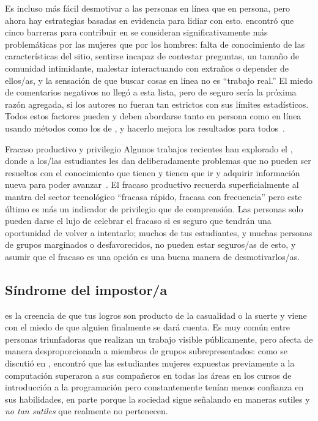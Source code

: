 Es incluso más fácil desmotivar a las personas en línea que en persona,
pero ahora hay estrategias basadas en evidencia para lidiar con esto.
\cite{Ford2016} encontró que cinco barreras para contribuir en 
se consideran significativamente más problemáticas por las mujeres que por los hombres:
falta de conocimiento de las características del sitio,
sentirse incapaz de contestar preguntas,
un tamaño de comunidad intimidante,
malestar interactuando con extraños o depender de ellos/as,
y la sensación de que buscar cosas en línea no es ``trabajo real.''
El miedo de comentarios negativos no llegó a esta lista,
pero de seguro sería la próxima razón agregada, si los autores no fueran tan estrictos con sus límites estadísticos.
Todos estos factores pueden y deben abordarse tanto en persona como en línea
usando métodos como los de ,
y hacerlo mejora los resultados para todos~\cite{Sved2016}.

\begin{aside}{Fracaso productivo y privilegio}
  Algunos trabajos recientes han explorado el ,
 donde a los/las estudiantes les dan deliberadamente problemas que no pueden ser resueltos con el conocimiento que tienen
  y tienen que ir y adquirir información nueva para poder avanzar~\cite{Kapu2016}.
    El fracaso productivo recuerda superficialmente al mantra del sector tecnológico ``fracasa rápido, fracasa con frecuencia''
    pero este último es más un indicador de privilegio que de comprensión.
    Las personas solo pueden darse el lujo de celebrar el fracaso si es seguro que tendrán una oportunidad de volver a intentarlo;
    muchos de tus estudiantes,
    y muchas personas de grupos marginados o desfavorecidos,
    no pueden estar seguros/as de esto,
    y asumir que el fracaso es una opción es una buena manera de desmotivarlos/as.
\end{aside}

\subsection*{Síndrome del impostor/a}

es la creencia de que tus logros son producto de la casualidad o la suerte
y viene con el miedo de que alguien finalmente se dará cuenta.
Es muy común entre personas triunfadoras que realizan un trabajo visible públicamente,
pero afecta de manera desproporcionada a miembros de grupos subrepresentados:
como se discutió en ,
\cite{Wilc2018} encontró que
las estudiantes mujeres expuestas previamente a la computación superaron a sus compañeros en todas las áreas en los cursos de introducción a la programación
pero constantemente tenían menos confianza en sus habilidades,
en parte porque la sociedad sigue señalando en maneras sutiles y \emph{no tan sutiles}
que realmente no pertenecen.

